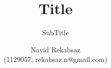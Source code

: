 \title{Title}
\subtitle{SubTitle \\[0.8cm] {\rmfamily\normalfont\Large}}

\author{
    Navid Rekabsaz \\ {\small (1129057, rekabsaz.n@gmail.com)}
}

\date{}
